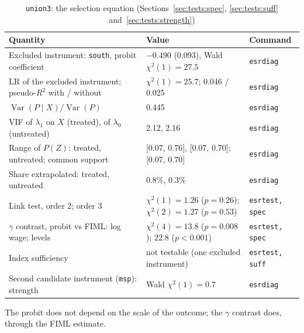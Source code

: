 \documentclass[11pt,a4paper]{article}
\theoremstyle{plain}
\theoremstyle{definition}
\theoremstyle{remark}
\newcommand{\Var}{\operatorname{Var}}
\newcommand{\1}{\mathbf{1}}
\newcommand{\cmd}[1]{\texttt{#1}}
\begin{document}
\begin{table}[!htb]
\centering
\caption{\cmd{union3}: the selection equation (Sections~\ref{sec:tests:spec}, \ref{sec:tests:suff} and~\ref{sec:tests:strength})}
\label{tab:u3:sel}
\scriptsize
\begin{tabular}{@{}L{5.9cm}L{6.4cm}L{2.5cm}@{}}
\toprule
Quantity & Value & Command \\
\midrule
Excluded instrument: \cmd{south}, probit coefficient & $-0.490$ (0.093), Wald $\chi^2(1)=27.5$ & \cmd{esrdiag} \\
LR of the excluded instrument; pseudo-$R^2$ with / without & $\chi^2(1)=25.7$; 0.046 / 0.025 & \cmd{esrdiag} \\
$\Var(P\mid X)/\Var(P)$ & 0.445 & \cmd{esrdiag} \\
VIF of $\lambda_1$ on $X$ (treated), of $\lambda_0$ (untreated) & 2.12, 2.16 & \cmd{esrdiag} \\
Range of $P(Z)$: treated, untreated; common support & [0.07, 0.76], [0.07, 0.70]; [0.07, 0.70] & \cmd{esrdiag} \\
Share extrapolated: treated, untreated & 0.8\%, 0.3\% & \cmd{esrdiag} \\
Link test, order 2; order 3 & $\chi^2(1)=1.26$ ($p=0.26$); $\chi^2(2)=1.27$ ($p=0.53$) & \cmd{esrtest, spec} \\
$\gamma$ contrast, probit vs FIML: log wage; levels & $\chi^2(4)=13.8$ ($p=0.008$); $22.8$ ($p<0.001$) & \cmd{esrtest, spec} \\
Index sufficiency & not testable (one excluded instrument) & \cmd{esrtest, suff} \\
Second candidate instrument (\cmd{msp}): strength & Wald $\chi^2(1)=0.7$ & \cmd{esrdiag} \\
\bottomrule
\end{tabular}
\parbox{0.95\textwidth}{\footnotesize The probit does not depend on the scale of the outcome; the $\gamma$ contrast does, through the FIML estimate.}
\end{table}
\end{document}
